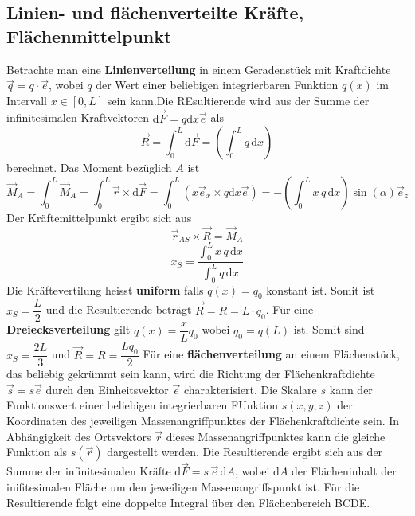 \subsection{Linien- und flächenverteilte Kräfte, Flächenmittelpunkt}
Betrachte man eine \textbf{Linienverteilung} in einem Geradenstück mit Kraftdichte $\overrightarrow{q}=q\cdot \overrightarrow{e}$, wobei $q$ der Wert einer beliebigen integrierbaren Funktion $q\left(x\right)$ im Intervall $x\in\left[0,L\right]$ sein kann.Die REsultierende wird aus der Summe der infinitesimalen Kraftvektoren $\text{d}\overrightarrow{F}=q\text{d}x\overrightarrow{e}$ als
\begin{equation}
\boxed{\overrightarrow{R}=\displaystyle \int_0^L\text{d}\overrightarrow{F}=\left(\displaystyle \int_0^Lq\,\text{d}x\right)}
\end{equation}
berechnet. Das Moment bezüglich $A$ ist
\begin{equation}
\boxed{\overrightarrow{M}_A=\displaystyle \int_0^L\text{}\overrightarrow{M}_A=\displaystyle \int_0^L\overrightarrow{r}\times \text{d}\overrightarrow{F}=\displaystyle \int_0^L\left(x\overrightarrow{e}_x\times q\text{d}x\overrightarrow{e}\right)=-\left(\displaystyle \int_0^Lx\, q\, \text{d}x\right)\sin\left(\alpha\right)\overrightarrow{e}_z}
\end{equation}
Der Kräftemittelpunkt ergibt sich aus
\begin{equation} 
\boxed{\overrightarrow{r}_{AS}\times \overrightarrow{R}=\overrightarrow{M}_A}
\end{equation} 
\begin{equation}
\boxed{x_S=\dfrac{\displaystyle \int_0^Lx \,q \,\text{d}x}{\displaystyle \int_0^Lq\,\text{d}x}} 
\end{equation} 
Die Kräftevertilung heisst \textbf{uniform} falls $q\left(x\right)=q_0$ konstant ist. Somit ist $x_S=\dfrac{L}{2}$ und die Resultierende beträgt $\overrightarrow{R}=R=L\cdot q_0$. 
\newline\newline
Für eine \textbf{Dreiecksverteilung} gilt $q\left(x\right)=\dfrac{x}{L}q_0$ wobei $q_0=q\left(L\right)$ ist. Somit sind $x_S=\dfrac{2L}{3}$ und $\overrightarrow{R}=R=\dfrac{Lq_0}{2}$
\newline\newline
Für eine \textbf{flächenverteilung} an einem Flächenstück, das beliebig gekrümmt sein kann, wird die Richtung der Flächenkraftdichte $\overrightarrow{s}=s\overrightarrow{e}$ durch den Einheitsvektor $\overrightarrow{e}$ charakterisiert. Die Skalare $s$ kann der Funktionswert einer beliebigen integrierbaren FUnktion $s\left(x,y,z\right)$ der Koordinaten des jeweiligen Massenangriffpunktes der Flächenkraftdichte sein. In Abhängigkeit des Ortsvektors $\overrightarrow{r}$ dieses Massenangriffpunktes kann die gleiche Funktion als $s\left(\overrightarrow{r}\right)$ dargestellt werden. Die Resultierende ergibt sich aus der Summe der infinitesimalen Kräfte $\text{d}\overrightarrow{F}=s\,\overrightarrow{e}\,\text{d}A$, wobei $\text{d}A$ der Flächeninhalt der inifitesimalen Fläche um den jeweiligen Massenangriffspunkt ist. Für die Resultierende folgt eine doppelte Integral über den Flächenbereich BCDE.
